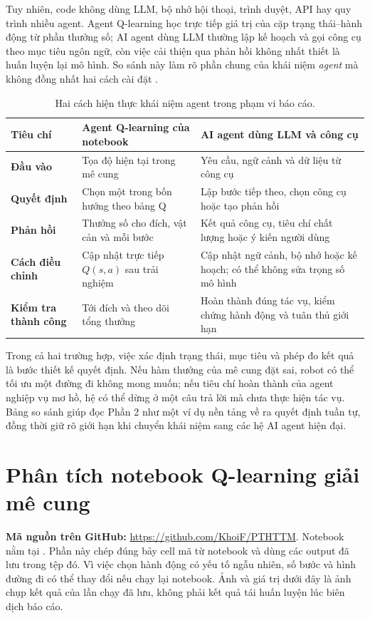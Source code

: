 \documentclass[12pt,a4paper]{report}
\begin{document}
Tuy nhiên, code không dùng LLM, bộ nhớ hội thoại, trình duyệt, API hay quy trình
nhiều agent. Agent Q-learning học trực tiếp giá trị của cặp trạng thái--hành động từ
phần thưởng số; AI agent dùng LLM thường lập kế hoạch và gọi công cụ theo mục tiêu
ngôn ngữ, còn việc cải thiện qua phản hồi không nhất thiết là huấn luyện lại mô hình.
So sánh này làm rõ phần chung của khái niệm \emph{agent} mà không đồng nhất hai cách
cài đặt \cite{google,ibm,mckinsey}.

\begin{table}[H]
\centering
\small
\caption{Hai cách hiện thực khái niệm agent trong phạm vi báo cáo.}
\begin{tabularx}{\textwidth}{>{\bfseries}p{2.9cm}XX}
\toprule
Tiêu chí & Agent Q-learning của notebook & AI agent dùng LLM và công cụ \\
\midrule
Đầu vào & Tọa độ hiện tại trong mê cung & Yêu cầu, ngữ cảnh và dữ liệu từ công cụ \\
Quyết định & Chọn một trong bốn hướng theo bảng Q & Lập bước tiếp theo, chọn công cụ hoặc tạo phản hồi \\
Phản hồi & Thưởng số cho đích, vật cản và mỗi bước & Kết quả công cụ, tiêu chí chất lượng hoặc ý kiến người dùng \\
Cách điều chỉnh & Cập nhật trực tiếp $Q(s,a)$ sau trải nghiệm & Cập nhật ngữ cảnh, bộ nhớ hoặc kế hoạch; có thể không sửa trọng số mô hình \\
Kiểm tra thành công & Tới đích và theo dõi tổng thưởng & Hoàn thành đúng tác vụ, kiểm chứng hành động và tuân thủ giới hạn \\
\bottomrule
\end{tabularx}
\end{table}

Trong cả hai trường hợp, việc xác định trạng thái, mục tiêu và phép đo kết quả là
bước thiết kế quyết định. Nếu hàm thưởng của mê cung đặt sai, robot có thể tối ưu
một đường đi không mong muốn; nếu tiêu chí hoàn thành của agent nghiệp vụ mơ hồ,
hệ có thể dừng ở một câu trả lời mà chưa thực hiện tác vụ. Bảng so sánh giúp đọc
Phần 2 như một ví dụ nền tảng về ra quyết định tuần tự, đồng thời giữ rõ giới hạn
khi chuyển khái niệm sang các hệ AI agent hiện đại.

\clearpage
{}

\chapter{Phân tích notebook Q-learning giải mê cung}
\label{chap:notebook}
\noindent\textbf{Mã nguồn trên GitHub:} \url{https://github.com/KhoiF/PTHTTM}.
Notebook nằm tại .
Phần này chép đúng bảy cell mã từ notebook và dùng các output đã lưu trong tệp đó.
Vì việc chọn hành động có yếu tố ngẫu nhiên, số bước và hình đường đi có thể thay
đổi nếu chạy lại notebook. Ảnh và giá trị dưới đây là ảnh chụp kết quả của lần chạy
đã lưu, không phải kết quả tái huấn luyện lúc biên dịch báo cáo.
\end{document}

